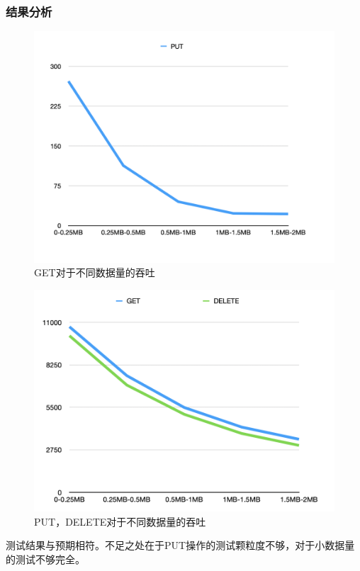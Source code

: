 \documentclass{ctexart}
\begin{document}
\subsubsection{结果分析}
\begin{figure}[h!]
  \centering
  \includegraphics[scale=0.3]{GET.png}
  \caption{GET对于不同数据量的吞吐}
  \label{fig:GET}
\end{figure}
\begin{figure}[h!]
  \centering
  \includegraphics[scale=0.3]{PUT-DELETE.png}
  \caption{PUT，DELETE对于不同数据量的吞吐}
  \label{fig:PUT-DELETE}
\end{figure}
测试结果与预期相符。不足之处在于PUT操作的测试颗粒度不够，对于小数据量的测试不够完全。
\end{document}
